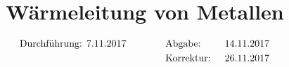 

\subject{v204}
\title{Wärmeleitung von Metallen}
\date{%
\begin{align}
& \text{Durchführung: 7.11.2017} & \hspace{3em} & \text{Abgabe: } & {14.11.2017}\notag \\
& & &\text{Korrektur: } & \text{26.11.2017} \notag
\end{align}
}



\maketitle
\thispagestyle{empty}
\tableofcontents
\newpage






\nocite{*}
\printbibliography{}


